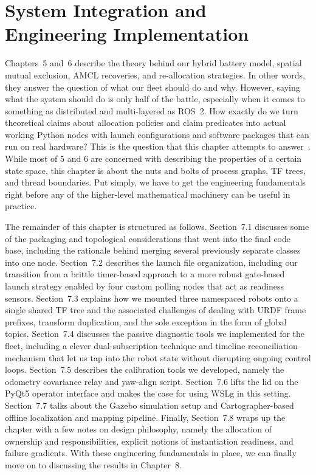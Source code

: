 \chapter{System Integration and Engineering Implementation\label{cha:chapter7}}

Chapters~5 and~6 describe the theory behind our hybrid battery model, spatial mutual exclusion, AMCL recoveries, and re-allocation strategies. In other words, they answer the question of what our fleet should do and why. However, saying what the system should do is only half of the battle, especially when it comes to something as distributed and multi-layered as ROS~2. How exactly do we turn theoretical claims about allocation policies and claim predicates into actual working Python nodes with launch configurations and software packages that can run on real hardware? This is the question that this chapter attempts to answer~\cite{quigley2015programming}. While most of 5 and 6 are concerned with describing the properties of a certain state space, this chapter is about the nuts and bolts of process graphs, TF trees, and thread boundaries. Put simply, we have to get the engineering fundamentals right before any of the higher-level mathematical machinery can be useful in practice.

The remainder of this chapter is structured as follows. Section~7.1 discusses some of the packaging and topological considerations that went into the final code base, including the rationale behind merging several previously separate classes into one node. Section~7.2 describes the launch file organization, including our transition from a brittle timer-based approach to a more robust gate-based launch strategy enabled by four custom polling nodes that act as readiness sensors. Section~7.3 explains how we mounted three namespaced robots onto a single shared TF tree and the associated challenges of dealing with URDF frame prefixes, transform duplication, and the sole exception in the form of global topics. Section~7.4 discusses the passive diagnostic tools we implemented for the fleet, including a clever dual-subscription technique and timeline reconciliation mechanism that let us tap into the robot state without disrupting ongoing control loops. Section~7.5 describes the calibration tools we developed, namely the odometry covariance relay and yaw-align script. Section~7.6 lifts the lid on the PyQt5 operator interface and makes the case for using WSLg in this setting. Section~7.7 talks about the Gazebo simulation setup and Cartographer-based offline localization and mapping pipeline. Finally, Section~7.8 wraps up the chapter with a few notes on design philosophy, namely the allocation of ownership and responsibilities, explicit notions of instantiation readiness, and failure gradients. With these engineering fundamentals in place, we can finally move on to discussing the results in Chapter~8.

